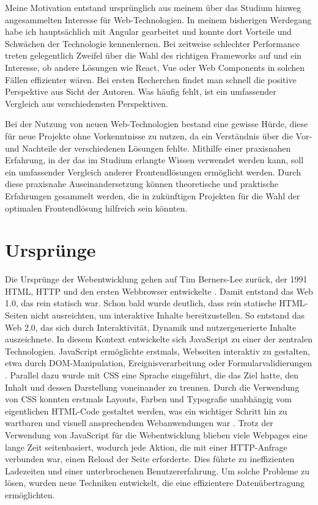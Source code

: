 \documentclass[oneside]{ausarbeitung}
\begin{document}
Meine Motivation entstand ursprünglich aus meinem über das Studium hinweg angesammelten Interesse für Web-Technologien. In meinem bisherigen Werdegang habe ich hauptsächlich mit Angular gearbeitet und konnte dort Vorteile und Schwächen der Technologie kennenlernen. Bei zeitweise schlechter Performance treten gelegentlich Zweifel über die Wahl des richtigen Frameworks auf und ein Interesse, ob andere Lösungen wie React, Vue oder Web Components in solchen Fällen effizienter wären. Bei ersten Recherchen findet man schnell die positive Perspektive aus Sicht der Autoren. Was häufig fehlt, ist ein umfassender Vergleich aus verschiedensten Perspektiven.

Bei der Nutzung von neuen Web-Technologien bestand eine gewisse Hürde, diese für neue Projekte ohne Vorkenntnisse zu nutzen, da ein Verständnis über die Vor- und Nachteile der verschiedenen Lösungen fehlte. Mithilfe einer praxisnahen Erfahrung, in der das im Studium erlangte Wissen verwendet werden kann, soll ein umfassender Vergleich anderer Frontendlösungen ermöglicht werden. Durch diese praxisnahe Auseinandersetzung können theoretische und praktische Erfahrungen gesammelt werden, die in zukünftigen Projekten für die Wahl der optimalen Frontendlösung hilfreich sein könnten.

\section{Ursprünge}
\label{sec:ursprünge}

Die Ursprünge der Webentwicklung gehen auf Tim Berners-Lee zurück, der 1991 HTML, HTTP und den ersten Webbrowser entwickelte \parencite{cern-www}. Damit entstand das Web 1.0, das rein statisch war.
Schon bald wurde deutlich, dass rein statische HTML-Seiten nicht ausreichten, um interaktive Inhalte bereitzustellen. So entstand das Web 2.0, das sich durch Interaktivität, Dynamik und nutzergenerierte Inhalte auszeichnete. In diesem Kontext entwickelte sich JavaScript zu einer der zentralen Technologien. JavaScript ermöglichte erstmals, Webseiten interaktiv zu gestalten, etwa durch DOM-Manipulation, Ereignisverarbeitung oder Formularvalidierungen \parencite{js-history}.
Parallel dazu wurde mit CSS eine Sprache eingeführt, die das Ziel hatte, den Inhalt und dessen Darstellung voneinander zu trennen. Durch die Verwendung von CSS konnten erstmals Layouts, Farben und Typografie unabhängig vom eigentlichen HTML-Code gestaltet werden, was ein wichtiger Schritt hin zu wartbaren und visuell ansprechenden Webanwendungen war \parencite{w3c_css_history}. Trotz der Verwendung von JavaScript für die Webentwicklung blieben viele Webpages eine lange Zeit seitenbasiert, wodurch jede Aktion, die mit einer HTTP-Anfrage verbunden war, einen Reload der Seite erforderte. Dies führte zu ineffizienten Ladezeiten und einer unterbrochenen Benutzererfahrung. Um solche Probleme zu lösen, wurden neue Techniken entwickelt, die eine effizientere Datenübertragung ermöglichten. 
\end{document}
